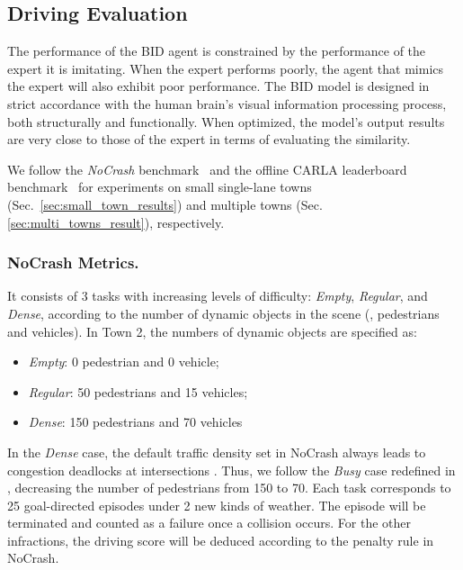 \subsection{Driving Evaluation}
\label{sec:Metrics}
\hspace{1pc}The performance of the BID agent is constrained by the performance of the expert it is imitating. 
When the expert performs poorly, the agent that mimics the expert will also exhibit poor performance. 
The BID model is designed in strict accordance with the human brain's visual information processing process, both structurally and functionally. 
When optimized, the model's output results are very close to those of the expert in terms of evaluating the similarity.


We follow the \emph{NoCrash} benchmark~\cite{Codevilla:2019} and the offline CARLA leaderboard benchmark~\cite{Zhang:2021,Hu:2022} for experiments on small single-lane towns (Sec.~\ref{sec:small_town_results}) and multiple towns (Sec.~ \ref{sec:multi_towns_result}), respectively.


\subsubsection{NoCrash Metrics.}\label{nocrash_metrics}

\hspace{1pc}It consists of 3 tasks with increasing levels of difficulty: \emph{Empty}, \emph{Regular}, and \emph{Dense}, according to the number of dynamic objects in the scene ({\ie}, pedestrians and vehicles). 
In Town 2, the numbers of dynamic objects are specified as:
\begin{itemize}
	\item \emph{Empty}: 0 pedestrian and 0 vehicle;
	\item \emph{Regular}: 50 pedestrians and 15 vehicles;
	\item \emph{Dense}: 150 pedestrians and 70 vehicles
\end{itemize}
In the \emph{Dense} case, the default traffic density set in NoCrash always leads to congestion deadlocks at intersections \cite{Zhang:2021}. 
Thus, we follow the \emph{Busy} case redefined in \cite{Zhang:2021}, decreasing the number of pedestrians from 150 to 70. 
Each task corresponds to 25 goal-directed episodes under 2 new kinds of weather.
The episode will be terminated and counted as a failure once a collision occurs. 
For the other infractions, the driving score will be deduced according to the penalty rule in NoCrash. 


